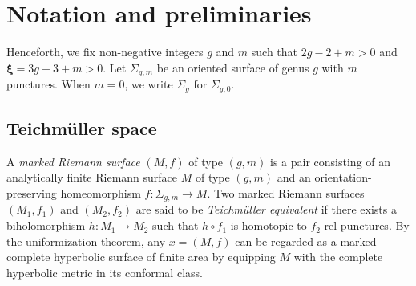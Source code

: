 \documentclass[dvipdfmx]{amsart}
\newtheorem{theorem}{Theorem}[section]
\newtheorem{corollary}{Corollary}[section]
\theoremstyle{remark}
\newcommand{\torelliG}{\mathcal{I}}
\newcommand{\convgenus}{{\boldsymbol \xi}}
\newcommand{\conservativepart}{\mathfrak{Cons}}
\begin{document}











\section{Notation and preliminaries}
Henceforth, we fix non-negative integers $g$ and $m$ such that $2g-2+m>0$ and $\convgenus=3g-3+m>0$.
Let $\Sigma_{g,m}$ be an oriented surface of genus $g$ with $m$ punctures.
When $m=0$, we write $\Sigma_g$ for $\Sigma_{g,0}$.


\subsection{Teichm\"uller space}
A \emph{marked Riemann surface} $(M,f)$ of type $(g,m)$ is a pair consisting of an analytically finite Riemann surface $M$ of type $(g,m)$ and an orientation-preserving homeomorphism $f\colon \Sigma_{g,m}\to M$.
Two marked Riemann surfaces $(M_1,f_1)$ and $(M_2,f_2)$ are said to be \emph{Teichm\"uller equivalent} if there exists a biholomorphism $h\colon M_1\to M_2$ such that $h\circ f_1$ is homotopic to $f_2$ rel punctures.
By the uniformization theorem, any $x=(M,f)$ can be regarded as a marked complete hyperbolic surface of finite area by equipping $M$ with the complete hyperbolic metric in its conformal class.
\end{document}
